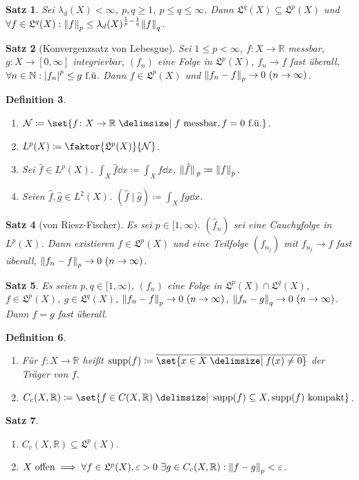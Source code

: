 \documentclass[a4paper]{article}
\newcounter{Sec}
\theoremstyle{marginbreak}
\newtheorem{definition}{Definition}[Sec]
\newtheorem{satz}[definition]{Satz}
\newcommand{\en}{~(n\to\infty)}
\newcommand{\R}{\mathbb{R}}
\renewcommand{\L}[1]{\mathfrak{L}^{#1}(X)}
\newcommand{\LL}[1]{L^{#1}(X)}
\DeclareMathOperator{\supp}{supp}
\begin{document}
	\begin{satz}
		Sei $\lambda_d(X)<\infty$, $p, q\geq 1$, $p\leq q\leq\infty$. Dann $\L{q}\subseteq\L{p}$ und
		$\forall f\in\L{q}:\norm{f}_p\leq\lambda_d(X)^{\frac{1}{p}-\frac{1}{q}}\norm{f}_q$.
	\end{satz}
	\begin{satz}[Konvergenzsatz von Lebesgue]
		Sei $1\leq p<\infty$, $f\colon X\to\R$ messbar, $g\colon X\to[0,\infty]$ integrierbar,
		$(f_n)$ eine Folge in $\L{p}$, $f_n\to f$ fast überall, $\forall n\in\mathbb{N}: \abs{f_n}^p\leq g~\text{f.ü}$.
		Dann $f\in\L{p}$ und $\norm{f_n-f}_p\to 0\en$.
	\end{satz}
	\begin{definition}
		\begin{enumerate}[label=(\alph*)]
			\item $\mathcal{N}\coloneqq\set{f\colon X\to\R\given f~\text{messbar}, f=0~\text{f.ü.}}$.
			\item $\LL{p}\coloneqq\faktor{\L{p}}{\mathcal{N}}$.
			\item Sei $\hat{f}\in\LL{p}$. $\int_X\hat{f}\dd{x}\coloneqq\int_Xf\dd{x}$, $\norm*{\hat{f}}_p\coloneqq\norm{f}_p$.
			\item Seien $\hat{f}, \hat{g}\in\LL{2}$. $(\hat{f}\mid\hat{g})\coloneqq\int_Xfg\dd{x}$.
		\end{enumerate}
	\end{definition}
	\begin{satz}[von Riesz-Fischer]
		Es sei $p\in[1,\infty)$. $(\hat{f}_n)$ sei eine Cauchyfolge in $\LL{p}$. Dann existieren $f\in\L{p}$ und
		eine Teilfolge $(f_{n_j})$ mit $f_{n_j}\to f$ fast überall, $\norm{f_n-f}_p\to0\en$.
	\end{satz}
	\begin{satz}
		Es seien $p, q\in[1,\infty)$, $(f_n)$ eine Folge in $\L{p}\cap\L{q}$, $f\in\L{p}$, $g\in\L{q}$,
		$\norm{f_n-f}_p\to 0\en$, $\norm{f_n-g}_q\to 0\en$. Dann $f=g$ fast überall.
	\end{satz}
	\begin{definition}
		\begin{enumerate}[label=(\alph*)]
			\item Für $f\colon X\to\R$ heißt $\supp(f)\coloneqq\overline{\set{x\in X\given f(x)\neq0}}$ der Träger von $f$.
			\item $C_c(X,\R)\coloneqq\set{f\in C(X,\R)\given \supp(f)\subseteq X, \supp(f)~\text{kompakt}}$.
		\end{enumerate}
	\end{definition}
	\begin{satz}
		\begin{enumerate}[label=(\alph*)]
			\item $C_c(X,\R)\subseteq\L{p}$.
			\item $X~\text{offen}\implies\forall f\in\L{p},\varepsilon>0~\exists g\in C_c(X,\R):\norm{f-g}_p<\varepsilon$.
		\end{enumerate}
	\end{satz}
\end{document}
